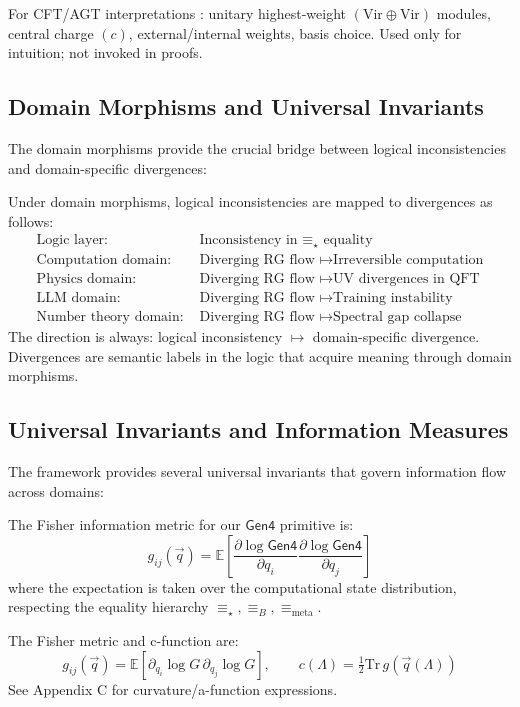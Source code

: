 \begin{notation}
\label{not:representation-data}
For CFT/AGT interpretations \cite{alday2010,nekrasov2003}: unitary highest-weight $(\mathrm{Vir}\oplus\mathrm{Vir})$ modules, central charge $(c)$, external/internal weights, basis choice. Used only for intuition; not invoked in proofs.
\end{notation}

\subsection{Domain Morphisms and Universal Invariants}

The domain morphisms provide the crucial bridge between logical inconsistencies and domain-specific divergences:

\begin{definition}
\label{def:divergence-mapping}
Under domain morphisms, logical inconsistencies are mapped to divergences as follows:
\begin{align}
\text{Logic layer: } &\text{Inconsistency in } \equiv_\star \text{ equality} \\
\text{Computation domain: } &\text{Diverging RG flow } \mapsto \text{Irreversible computation} \\
\text{Physics domain: } &\text{Diverging RG flow } \mapsto \text{UV divergences in QFT} \\
\text{LLM domain: } &\text{Diverging RG flow } \mapsto \text{Training instability} \\
\text{Number theory domain: } &\text{Diverging RG flow } \mapsto \text{Spectral gap collapse}
\end{align}
The direction is always: logical inconsistency $\mapsto$ domain-specific divergence. Divergences are semantic labels in the logic that acquire meaning through domain morphisms.
\end{definition}

\subsection{Universal Invariants and Information Measures}

The framework provides several universal invariants that govern information flow across domains:

\begin{definition}
\label{def:fisher-metric-gen4}
The Fisher information metric for our $\mathsf{Gen4}$ primitive is:
\[
g_{ij}(\vec{q}) = \mathbb{E}\left[\frac{\partial \log \mathsf{Gen4}}{\partial q_i} \frac{\partial \log \mathsf{Gen4}}{\partial q_j}\right]
\]
where the expectation is taken over the computational state distribution, respecting the equality hierarchy $\equiv_\star, \equiv_B, \equiv_{\text{meta}}$.

The Fisher metric and c-function are:
\[
g_{ij}(\vec q)=\mathbb E\left[\partial_{q_i}\log G\,\partial_{q_j}\log G\right],\qquad
c(\Lambda)=\tfrac12\mathrm{Tr}\,g(\vec q(\Lambda))
\]
See Appendix C for curvature/a-function expressions.
\end{definition}

